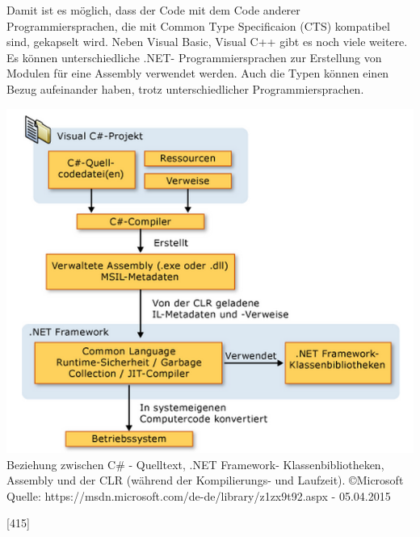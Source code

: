 \documentclass[12pt,a4paper]{report}
\begin{document}
\begin{onehalfspace}
Damit ist es möglich, dass der Code mit dem Code anderer Programmiersprachen, die mit Common Type Specificaion (CTS) kompatibel sind, gekapselt wird. Neben Visual Basic, Visual C++ gibt es noch viele weitere. Es können unterschiedliche .NET- Programmiersprachen zur Erstellung von Modulen für eine Assembly verwendet werden. Auch die Typen können einen Bezug aufeinander haben, trotz unterschiedlicher Programmiersprachen.
\begin{center}
\includegraphics[scale=0.8]{img/uebersetzung.png}\\
Beziehung zwischen C\# - Quelltext, .NET Framework- Klassenbibliotheken, Assembly und der CLR (während der Kompilierungs- und Laufzeit).
\copyright Microsoft\\
Quelle: https://msdn.microsoft.com/de-de/library/z1zx9t92.aspx - 05.04.2015
\end{center}
[415]


\end{onehalfspace}
\end{document}
